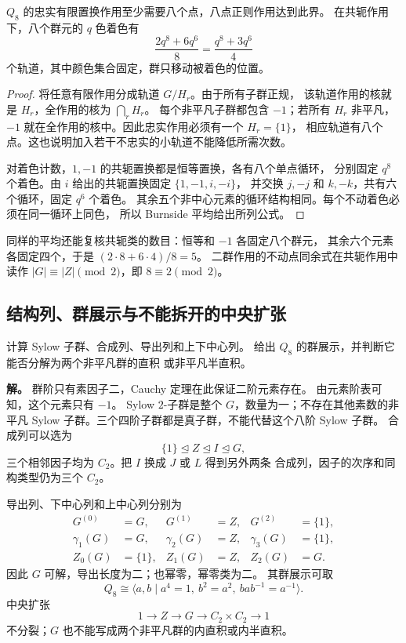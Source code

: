 \begin{proposition}[忠实置换作用的最小次数与着色计数]
\label{prop:q8-permutation-coloring}
$Q_8$ 的忠实有限置换作用至少需要八个点，八点正则作用达到此界。
在共轭作用下，八个群元的 $q$ 色着色有
\[
\frac{2q^8+6q^6}{8}=\frac{q^8+3q^6}{4}
\]
个轨道，其中颜色集合固定，群只移动被着色的位置。
\end{proposition}

\begin{proof}
将任意有限作用分成轨道 $G/H_r$。由于所有子群正规，
该轨道作用的核就是 $H_r$，全作用的核为 $\bigcap_rH_r$。
每个非平凡子群都包含 $-1$；若所有 $H_r$ 非平凡，
$-1$ 就在全作用的核中。因此忠实作用必须有一个 $H_r=\{1\}$，
相应轨道有八个点。这也说明加入若干不忠实的小轨道不能降低所需次数。

对着色计数，$1,-1$ 的共轭置换都是恒等置换，各有八个单点循环，
分别固定 $q^8$ 个着色。由 $i$ 给出的共轭置换固定 $\{1,-1,i,-i\}$，
并交换 $j,-j$ 和 $k,-k$，共有六个循环，固定 $q^6$ 个着色。
其余五个非中心元素的循环结构相同。每个不动着色必须在同一循环上同色，
所以 Burnside 平均给出所列公式。
\end{proof}

同样的平均还能复核共轭类的数目：恒等和 $-1$ 各固定八个群元，
其余六个元素各固定四个，于是 $(2\cdot8+6\cdot4)/8=5$。
二群作用的不动点同余式在共轭作用中读作
$|G|\equiv|Z|\pmod2$，即 $8\equiv2\pmod2$。

\subsection{结构列、群展示与不能拆开的中央扩张}

\begin{exbox}[全部子群正规是否意味着直积]
计算 Sylow 子群、合成列、导出列和上下中心列。
给出 $Q_8$ 的群展示，并判断它能否分解为两个非平凡群的直积
或非平凡半直积。
\end{exbox}

\textbf{解。} 群阶只有素因子二，Cauchy 定理在此保证二阶元素存在。
由元素阶表可知，这个元素只有 $-1$。
Sylow $2$-子群是整个 $G$，数量为一；不存在其他素数的非平凡
Sylow 子群。三个四阶子群都是真子群，不能代替这个八阶 Sylow 子群。
合成列可以选为
\[
\{1\}\trianglelefteq Z\trianglelefteq I\trianglelefteq G,
\]
三个相邻因子均为 $C_2$。把 $I$ 换成 $J$ 或 $L$ 得到另外两条
合成列，因子的次序和同构类型仍为三个 $C_2$。

\begin{proposition}[二步幂零结构与非分裂性]
\label{prop:q8-series-extension}
导出列、下中心列和上中心列分别为
\[
\begin{aligned}
G^{(0)}&=G,&G^{(1)}&=Z,&G^{(2)}&=\{1\},\\
\gamma_1(G)&=G,&\gamma_2(G)&=Z,&\gamma_3(G)&=\{1\},\\
Z_0(G)&=\{1\},&Z_1(G)&=Z,&Z_2(G)&=G.
\end{aligned}
\]
因此 $G$ 可解，导出长度为二；也幂零，幂零类为二。
其群展示可取
\[
Q_8\cong\langle a,b\mid a^4=1,\ b^2=a^2,\ bab^{-1}=a^{-1}\rangle.
\]
中央扩张
\[
1\longrightarrow Z\longrightarrow G\longrightarrow C_2\times C_2
\longrightarrow1
\]
不分裂；$G$ 也不能写成两个非平凡群的内直积或内半直积。
\end{proposition}

